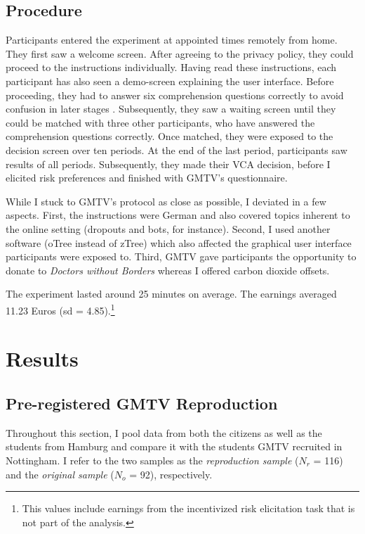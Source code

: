 \documentclass[
  authoryear,
  preprint,
  3p]{elsarticle}
\begin{document}
\hypertarget{sec-procedure}{%
\subsection{Procedure}\label{sec-procedure}}

Participants entered the experiment at appointed times remotely from
home. They first saw a welcome screen. After agreeing to the privacy
policy, they could proceed to the instructions individually. Having read
these instructions, each participant has also seen a demo-screen
explaining the user interface. Before proceeding, they had to answer six
comprehension questions correctly to avoid confusion in later stages
\citep{FerraroVossler2010}. Subsequently, they saw a waiting screen
until they could be matched with three other participants, who have
answered the comprehension questions correctly. Once matched, they were
exposed to the decision screen over ten periods. At the end of the last
period, participants saw results of all periods. Subsequently, they made
their VCA decision, before I elicited risk preferences
\citep{HoltLaury2002} and finished with GMTV's questionnaire.

While I stuck to GMTV's protocol as close as possible, I deviated in a
few aspects. First, the instructions were German and also covered topics
inherent to the online setting (dropouts and bots, for instance).
Second, I used another software (oTree instead of zTree) which also
affected the graphical user interface participants were exposed to.
Third, GMTV gave participants the opportunity to donate to \emph{Doctors
without Borders} whereas I offered carbon dioxide offsets.

The experiment lasted around 25 minutes on average. The earnings
averaged 11.23 Euros (sd = 4.85).\footnote{This values include earnings
  from the incentivized risk elicitation task that is not part of the
  analysis.}

\hypertarget{sec-results}{%
\section{Results}\label{sec-results}}

\hypertarget{sec-replication}{%
\subsection{Pre-registered GMTV Reproduction}\label{sec-replication}}

Throughout this section, I pool data from both the citizens as well as
the students from Hamburg and compare it with the students GMTV
recruited in Nottingham. I refer to the two samples as the
\emph{reproduction sample} (\(N_r\) = 116) and the \emph{original
sample} (\(N_o\) = 92), respectively.
\end{document}
